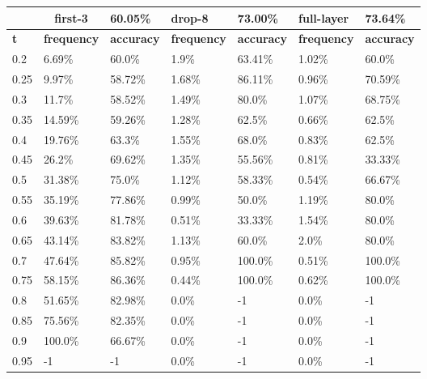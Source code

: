 
\begin{table}[t]
\centering
\begin{tabular}{lllllll}
\hline
\multicolumn{1}{c}{} & \multicolumn{1}{c}{first-3} & \multicolumn{1}{l|}{60.05\%} & drop-8 & \multicolumn{1}{l|}{73.00\%} & full-layer & 73.64\% \\ \hline
\multicolumn{1}{l|}{\textbf{t}} & \textbf{frequency} & \multicolumn{1}{l|}{\textbf{accuracy}} & \textbf{frequency} & \multicolumn{1}{l|}{\textbf{accuracy}} & \textbf{frequency} & \textbf{accuracy} \\ \hline	\multicolumn{1}{l|}{0.2}&  6.69\% & \multicolumn{1}{l|}{60.0\%}& 1.9\% & \multicolumn{1}{l|}{63.41\%}& 1.02\% & 60.0\%\\ 
\multicolumn{1}{l|}{0.25}&  9.97\% & \multicolumn{1}{l|}{58.72\%}& 1.68\% & \multicolumn{1}{l|}{86.11\%}& 0.96\% & 70.59\%\\ 
\multicolumn{1}{l|}{0.3}&  11.7\% & \multicolumn{1}{l|}{58.52\%}& 1.49\% & \multicolumn{1}{l|}{80.0\%}& 1.07\% & 68.75\%\\ 
\multicolumn{1}{l|}{0.35}&  14.59\% & \multicolumn{1}{l|}{59.26\%}& 1.28\% & \multicolumn{1}{l|}{62.5\%}& 0.66\% & 62.5\%\\ 
\multicolumn{1}{l|}{0.4}&  19.76\% & \multicolumn{1}{l|}{63.3\%}& 1.55\% & \multicolumn{1}{l|}{68.0\%}& 0.83\% & 62.5\%\\ 
\multicolumn{1}{l|}{0.45}&  26.2\% & \multicolumn{1}{l|}{69.62\%}& 1.35\% & \multicolumn{1}{l|}{55.56\%}& 0.81\% & 33.33\%\\ 
\multicolumn{1}{l|}{0.5}&  31.38\% & \multicolumn{1}{l|}{75.0\%}& 1.12\% & \multicolumn{1}{l|}{58.33\%}& 0.54\% & 66.67\%\\ 
\multicolumn{1}{l|}{0.55}&  35.19\% & \multicolumn{1}{l|}{77.86\%}& 0.99\% & \multicolumn{1}{l|}{50.0\%}& 1.19\% & 80.0\%\\ 
\multicolumn{1}{l|}{0.6}&  39.63\% & \multicolumn{1}{l|}{81.78\%}& 0.51\% & \multicolumn{1}{l|}{33.33\%}& 1.54\% & 80.0\%\\ 
\multicolumn{1}{l|}{0.65}&  43.14\% & \multicolumn{1}{l|}{83.82\%}& 1.13\% & \multicolumn{1}{l|}{60.0\%}& 2.0\% & 80.0\%\\ 
\multicolumn{1}{l|}{0.7}&  47.64\% & \multicolumn{1}{l|}{85.82\%}& 0.95\% & \multicolumn{1}{l|}{100.0\%}& 0.51\% & 100.0\%\\ 
\multicolumn{1}{l|}{0.75}&  58.15\% & \multicolumn{1}{l|}{86.36\%}& 0.44\% & \multicolumn{1}{l|}{100.0\%}& 0.62\% & 100.0\%\\ 
\multicolumn{1}{l|}{0.8}&  51.65\% & \multicolumn{1}{l|}{82.98\%}& 0.0\% & \multicolumn{1}{l|}{-1}& 0.0\% & -1\\ 
\multicolumn{1}{l|}{0.85}&  75.56\% & \multicolumn{1}{l|}{82.35\%}& 0.0\% & \multicolumn{1}{l|}{-1}& 0.0\% & -1\\ 
\multicolumn{1}{l|}{0.9}&  100.0\% & \multicolumn{1}{l|}{66.67\%}& 0.0\% & \multicolumn{1}{l|}{-1}& 0.0\% & -1\\ 
\multicolumn{1}{l|}{0.95}&  -1 & \multicolumn{1}{l|}{-1}& 0.0\% & \multicolumn{1}{l|}{-1}& 0.0\% & -1\\ 


\end{tabular}
\end{table}
